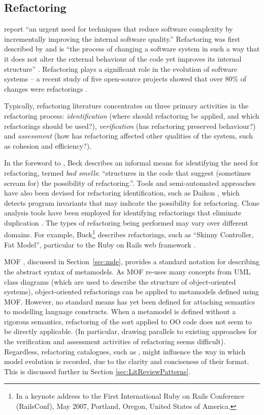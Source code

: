 \subsection{Refactoring}
\label{subsec:refactoring}
\cite{mens04survey} report ``an urgent need for techniques that reduce software complexity by incrementally improving the internal software quality.'' Refactoring was first described by \cite{opdyke92refactoring} and is ``the process of changing a software system in such a way that it does not alter the external behaviour of the code yet improves its internal structure'' \cite[pg. xvi]{fowler99refactoring}. Refactoring plays a significant role in the evolution of software systems -- a recent study of five open-source projects showed that over 80\% of changes were refactorings \cite{dig06apis}.

Typically, refactoring literature concentrates on three primary activities in the refactoring process: \emph{identification} (where should refactoring be applied, and which refactorings should be used?), \emph{verification} (has refactoring preserved behaviour?) and \emph{assessment} (how has refactoring affected other qualities of the system, such as cohesion and efficiency?).

In the foreword to \cite{fowler99refactoring}, Beck describes an informal means for identifying the need for refactoring, termed \textit{bad smells}: ``structures in the code that suggest (sometimes scream for) the possibility of refactoring.''. Tools and semi-automated approaches have also been devised for refactoring identification, such as Daikon \cite{kataoka01automated}, which detects program invariants that may indicate the possibility for refactoring. Clone analysis tools have been employed for identifying refactorings that eliminate duplication \cite{balazinska00advanced,ducasse99language}. The types of refactoring being performed may vary over different domains. For example, Buck\footnote{In a keynote address to the First International Ruby on Rails Conference (RailsConf), May 2007, Portland, Oregon, United States of America.} describes refactorings, such as ``Skinny Controller, Fat Model'', particular to the Ruby on Rails web framework \cite{ror}.

MOF \cite{mof}, discussed in Section~\ref{sec:mde}, provides a standard notation for describing the abstract syntax of metamodels. As MOF re-uses many concepts from UML class diagrams (which are used to describe the structure of object-oriented systems), object-oriented refactorings can be applied to metamodels defined using MOF. However, no standard means has yet been defined for attaching semantics to modelling language constructs. When a metamodel is defined without a rigorous semantics, refactoring of the sort applied to OO code does not seem to be directly applicable. (In particular, drawing parallels to existing approaches for the verification and assessment activities of refactoring seems difficult). Regardless, refactoring catalogues, such as \cite{fowler99refactoring}, might influence the way in which model evolution is recorded, due to the clarity and conciseness of their format. This is discussed further in Section \ref{sec:LitReviewPatterns}.

